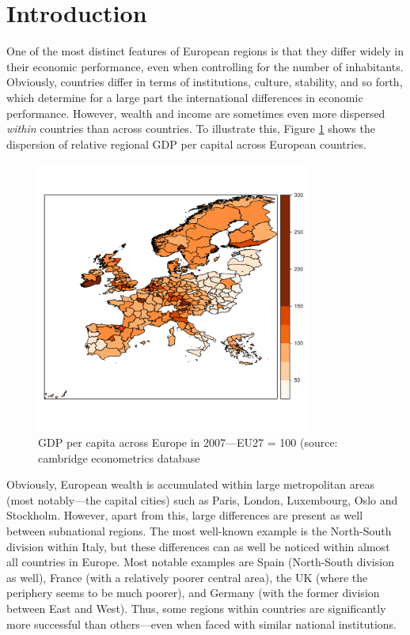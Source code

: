 \documentclass[11pt,parskip,abstracton,notitlepage]{scrartcl}
\begin{document}
\section{Introduction}
%
One of the most distinct features of European regions is that they differ widely in their economic performance, even when controlling for the number of inhabitants. Obviously, countries differ in terms of institutions, culture, stability, and so forth, which determine for a large part the international differences in economic performance. However, wealth and income are sometimes even more dispersed \emph{within} countries than across countries. To illustrate this, Figure \ref{fig:gdppc} shows the dispersion of relative regional GDP per capital across European countries.

\begin{figure}[h]
	\center
	\includegraphics[width=0.8\textwidth]{fig/gdppc}
	\caption{GDP per capita across Europe in 2007---EU27 = 100 (source: cambridge econometrics database}
	\label{fig:gdppc}
\end{figure}

Obviously, European wealth is accumulated within large metropolitan areas (most notably---the capital cities) such as Paris, London, Luxembourg, Oslo and Stockholm. However, apart from this, large differences are present as well between subnational regions. The most well-known example is the North-South division within Italy, but these differences can as well be noticed within almost all countries in Europe. Most notable examples are Spain (North-South division as well), France (with a relatively poorer central area), the UK (where the periphery seems to be much poorer), and Germany (with the former division between East and West). Thus, some regions within countries are significantly more successful than others---even when faced with similar national institutions. 
\end{document}
